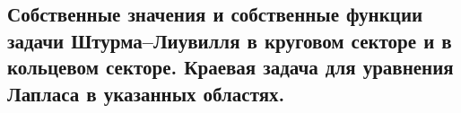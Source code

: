 \subsection{Собственные значения и собственные функции задачи Штурма–Лиувилля в круговом секторе и в кольцевом секторе. Краевая задача для уравнения Лапласа в указанных областях.}
